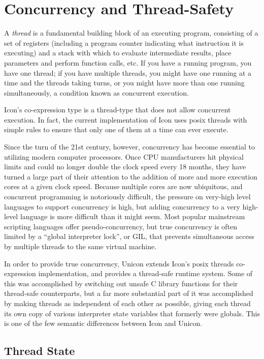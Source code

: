 \chapter{Concurrency and Thread-Safety}

\label{Unicon-Concurrency-Thread_Safety}
A {\em thread\/} is a fundamental building block of an executing
program, consisting of a set of registers (including a program counter
indicating what instruction it is executing) and a stack with which
to evaluate intermediate results, place parameters and perform
function calls, etc.  If you have a running program, you have one
thread; if you have multiple threads, you might have one running at
a time and the threads taking turns, or you might have more than one
running simultaneously, a condition known as concurrent execution.

Icon's co-expression type is a thread-type that does not allow
concurrent execution.  In fact, the current implementation of Icon
uses posix threads with simple rules to ensure that only one of them
at a time can ever execute.

Since the turn of the 21st century, however, concurrency has become
essential to utilizing modern computer processors.  Once CPU
manufacturers hit physical limits and could no longer double the
clock speed every 18 months, they have turned a large part of their
attention to the addition of more and more execution cores at a given
clock speed.  Because multiple cores are now ubiquitous, and
concurrent programming is notoriously difficult, the pressure on
very-high level languages to support concurrency is high, but
adding concurrency to a very high-level language is more difficult
than it might seem.  Most popular mainstream scripting languages
offer pseudo-concurrency, but true concurrency is often limited by
a ``global interpreter lock'', or GIL, that prevents simultaneous
access by multiple threads to the same virtual machine.

In order to provide true concurrency, Unicon extends Icon's posix
threads co-expression implementation, and provides a thread-safe
runtime system.  Some of this was accomplished by switching out unsafe
C library functions for their thread-safe counterparts, but a far more
substantial part of it was accomplished by making threads as
independent of each other as possible, giving each thread its own copy
of various interpreter state variables that formerly were
globals. This is one of the few semantic differences between Icon and
Unicon.

\section{Thread State}

